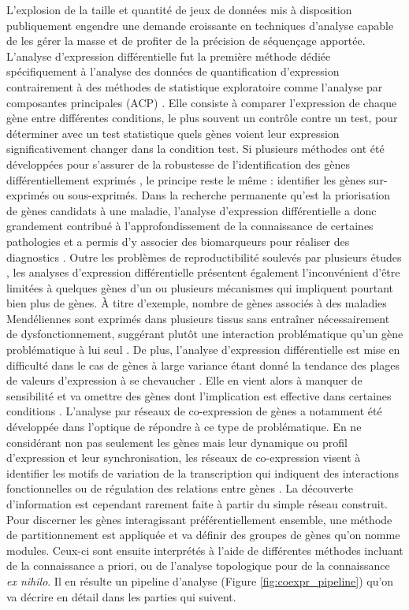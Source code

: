 L'explosion de la taille et quantité de jeux de données mis à disposition publiquement engendre une demande croissante en techniques d'analyse capable de les gérer la masse et de profiter de la précision de séquençage apportée. L'analyse d'expression différentielle fut la première méthode dédiée spécifiquement à l'analyse des données de quantification d'expression contrairement à des méthodes de statistique exploratoire comme l'analyse par composantes principales (ACP) \cite{deKok2005Jan}. Elle consiste à comparer l'expression de chaque gène entre différentes conditions, le plus souvent un contrôle contre un test, pour déterminer avec un test statistique quels gènes voient leur expression significativement changer dans la condition test. Si plusieurs méthodes ont été développées pour s'assurer de la robustesse de l'identification des gènes différentiellement exprimés \cite{Soneson2013Dec,Spies2019Jan}, le principe reste le même : identifier les gènes sur-exprimés ou sous-exprimés. Dans la recherche permanente qu'est la priorisation de gènes candidats à une maladie, l'analyse d'expression différentielle a donc grandement contribué à l'approfondissement de la connaissance de certaines pathologies et a permis d'y associer des biomarqueurs pour réaliser des diagnostics \cite{Costa-Silva2017Dec}. Outre les problèmes de reproductibilité soulevés par plusieurs études \cite{Ostlund2014}, les analyses d'expression différentielle présentent 
également l'inconvénient d'être limitées à quelques gènes d'un ou plusieurs mécanismes qui impliquent pourtant bien plus de gènes. À titre d'exemple, nombre de gènes associés à des maladies Mendéliennes sont exprimés dans plusieurs tissus sans entraîner nécessairement de dysfonctionnement, suggérant plutôt une interaction problématique qu'un gène problématique à lui seul \cite{Hekselman2020Mar}. De plus, l'analyse d'expression différentielle est mise en difficulté dans le cas de gènes à large variance étant donné la tendance des plages de valeurs d'expression à se chevaucher \cite{Ostlund2014}. Elle en vient alors à manquer de sensibilité et va omettre des gènes dont l'implication est effective dans certaines conditions \cite{delaFuente2010Jul}. L'analyse par réseaux de co-expression de gènes a notamment été développée dans l'optique de répondre à ce type de problématique. En ne considérant non pas seulement les gènes mais leur dynamique ou profil d'expression et leur synchronisation, les réseaux de co-expression visent à identifier les motifs de variation de la transcription qui indiquent des interactions fonctionnelles ou de régulation des relations entre gènes \cite{Parsana2019}. La découverte d'information est cependant rarement faite à partir du simple réseau construit. Pour discerner les gènes interagissant préférentiellement ensemble, une méthode de partitionnement est appliquée et va définir des groupes de gènes qu'on nomme \glspl{module}. Ceux-ci sont ensuite interprétés à l'aide de différentes méthodes incluant de la connaissance a priori, ou de l'analyse topologique pour de la connaissance \textit{ex nihilo}. Il en résulte un pipeline d'analyse (Figure \ref{fig:coexpr_pipeline}) \cite{Zhang2005a} qu'on va décrire en détail dans les parties qui suivent.


